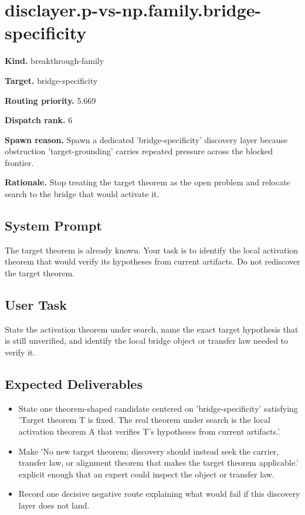 \documentclass[11pt]{article}
\begin{document}
\section{disclayer.p-vs-np.family.bridge-specificity}
\textbf{Kind.} breakthrough-family

\textbf{Target.} bridge-specificity

\textbf{Routing priority.} 5.669

\textbf{Dispatch rank.} 6

\textbf{Spawn reason.} Spawn a dedicated 'bridge-specificity' discovery layer because obstruction 'target-grounding' carries repeated pressure across the blocked frontier.

\textbf{Rationale.} Stop treating the target theorem as the open problem and relocate search to the bridge that would activate it.

\subsection*{System Prompt}
The target theorem is already known. Your task is to identify the local activation theorem that would verify its hypotheses from current artifacts. Do not rediscover the target theorem.

\subsection*{User Task}
State the activation theorem under search, name the exact target hypothesis that is still unverified, and identify the local bridge object or transfer law needed to verify it.

\subsection*{Expected Deliverables}
\begin{itemize}[leftmargin=*,itemsep=0.2em]
\item State one theorem-shaped candidate centered on 'bridge-specificity' satisfying 'Target theorem T is fixed. The real theorem under search is the local activation theorem A that verifies T's hypotheses from current artifacts.'.
\item Make 'No new target theorem; discovery should instead seek the carrier, transfer law, or alignment theorem that makes the target theorem applicable.' explicit enough that an expert could inspect the object or transfer law.
\item Record one decisive negative route explaining what would fail if this discovery layer does not land.
\end{itemize}
\end{document}
